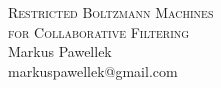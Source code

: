 \documentclass[crop=false,10pt]{standalone}
\begin{document}
  \begin{center}
    {%
      \Large
      \scshape
      Restricted Boltzmann Machines \\
      for Collaborative Filtering \\
    }
    \bigskip
    Markus Pawellek \\
    markuspawellek@gmail.com
  \end{center}
\end{document}
